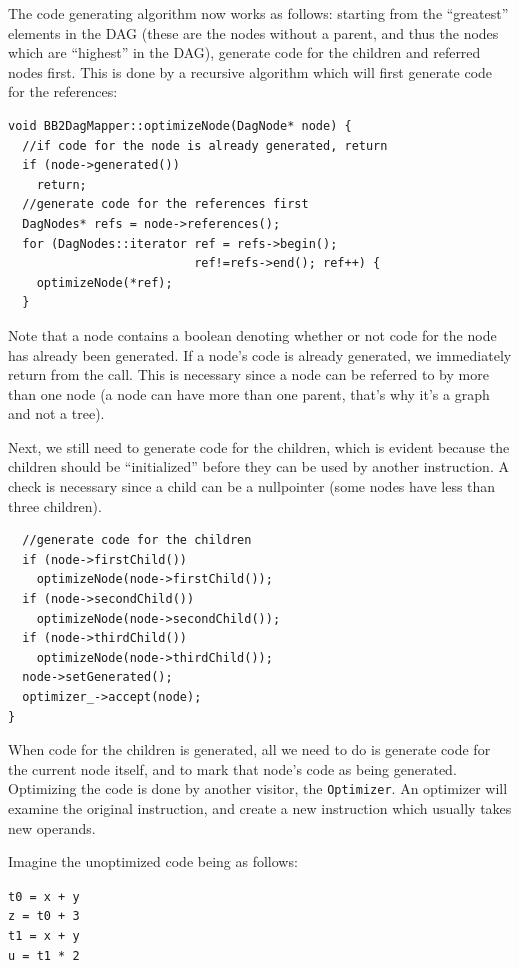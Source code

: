 \documentclass[a4paper]{article}
\begin{document}
The code generating algorithm now works as follows: starting from the
``greatest'' elements in the DAG (these are the nodes without a parent, and
thus the nodes which are ``highest'' in the DAG), generate code for the
children and referred nodes first. This is done by a recursive algorithm which
will first generate code for the references:

\begin{verbatim}
void BB2DagMapper::optimizeNode(DagNode* node) {
  //if code for the node is already generated, return
  if (node->generated())
    return;
  //generate code for the references first
  DagNodes* refs = node->references();
  for (DagNodes::iterator ref = refs->begin();
                          ref!=refs->end(); ref++) {
    optimizeNode(*ref);
  }
\end{verbatim}

Note that a node contains a boolean denoting whether or not code for the node
has already been generated. If a node's code is already generated, we
immediately return from the call. This is necessary since a node can be
referred to by more than one node (a node can have more than one parent,
that's why it's a graph and not a tree).

Next, we still need to generate code for the children, which is evident
because the children should be ``initialized'' before they can be used by
another instruction. A check is necessary since a child can be a nullpointer
(some nodes have less than three children).

\begin{verbatim}
  //generate code for the children
  if (node->firstChild())
    optimizeNode(node->firstChild());
  if (node->secondChild())
    optimizeNode(node->secondChild());
  if (node->thirdChild())
    optimizeNode(node->thirdChild());
  node->setGenerated();
  optimizer_->accept(node);
}
\end{verbatim}

When code for the children is generated, all we need to do is generate code
for the current node itself, and to mark that node's code as being generated.
Optimizing the code is done by another visitor, the \texttt{Optimizer}. An
optimizer will examine the original instruction, and create a new instruction
which usually takes new operands.

Imagine the unoptimized code being as follows:\\
\begin{center}
\texttt{t0 = x + y}\\
\texttt{z = t0 + 3}\\
\texttt{t1 = x + y}\\
\texttt{u = t1 * 2}\\
\end{center}
\end{document}
